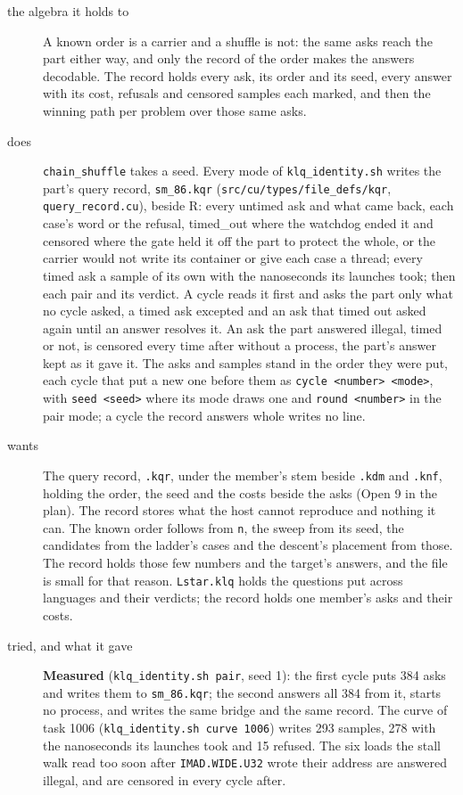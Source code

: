\begin{description}
\item[{the algebra it holds to}] A known order is a carrier and a shuffle is not: the same asks reach the part either way, and only the record of the order makes the answers decodable. The record holds every ask, its order and its seed, every answer with its cost, refusals and censored samples each marked, and then the winning path per problem over those same asks.
\item[{does}] \texttt{chain\_\allowbreak{}shuffle} takes a seed. Every mode of \texttt{klq\_\allowbreak{}identity.\allowbreak{}sh} writes the part's query record, \texttt{sm\_\allowbreak{}86.\allowbreak{}kqr} (\texttt{src/\allowbreak{}cu/\allowbreak{}types/\allowbreak{}file\_\allowbreak{}defs/\allowbreak{}kqr}, \texttt{query\_\allowbreak{}record.\allowbreak{}cu}), beside R: every untimed ask and what came back, each case's word or the refusal, timed\_\allowbreak{}out where the watchdog ended it and censored where the gate held it off the part to protect the whole, or the carrier would not write its container or give each case a thread; every timed ask a sample of its own with the nanoseconds its launches took; then each pair and its verdict. A cycle reads it first and asks the part only what no cycle asked, a timed ask excepted and an ask that timed out asked again until an answer resolves it. An ask the part answered illegal, timed or not, is censored every time after without a process, the part's answer kept as it gave it. The asks and samples stand in the order they were put, each cycle that put a new one before them as \texttt{cycle <number> <mode>}, with \texttt{seed <seed>} where its mode draws one and \texttt{round <number>} in the pair mode; a cycle the record answers whole writes no line.
\item[{wants}] The query record, \texttt{.\allowbreak{}kqr}, under the member's stem beside \texttt{.\allowbreak{}kdm} and \texttt{.\allowbreak{}knf}, holding the order, the seed and the costs beside the asks (Open 9 in the plan). The record stores what the host cannot reproduce and nothing it can. The known order follows from \texttt{n}, the sweep from its seed, the candidates from the ladder's cases and the descent's placement from those. The record holds those few numbers and the target's answers, and the file is small for that reason. \texttt{Lstar.\allowbreak{}klq} holds the questions put across languages and their verdicts; the record holds one member's asks and their costs.
\item[{tried, and what it gave}] \textbf{Measured} (\texttt{klq\_\allowbreak{}identity.\allowbreak{}sh pair}, seed 1): the first cycle puts 384 asks and writes them to \texttt{sm\_\allowbreak{}86.\allowbreak{}kqr}; the second answers all 384 from it, starts no process, and writes the same bridge and the same record. The curve of task 1006 (\texttt{klq\_\allowbreak{}identity.\allowbreak{}sh curve 1006}) writes 293 samples, 278 with the nanoseconds its launches took and 15 refused. The six loads the stall walk read too soon after \texttt{IMAD.\allowbreak{}WIDE.\allowbreak{}U32} wrote their address are answered illegal, and are censored in every cycle after.

\end{description}
